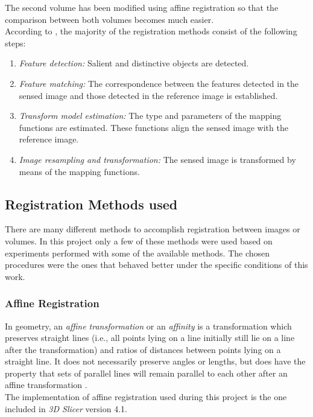 The second volume has been modified using affine registration so that
the comparison between both volumes becomes much easier.\\

According to \cite{zitova}, the majority of the registration methods consist of the following steps:
\begin{enumerate}
\item \textit{Feature detection:} Salient and distinctive objects are detected.
\item \textit{Feature matching:} The correspondence between the features detected in the sensed image and those detected in the reference image is established.
\item \textit{Transform model estimation:} The type and parameters of the mapping functions are estimated. These functions align the sensed image with the reference image.
\item \textit{Image resampling and transformation:} The sensed image is transformed by means of the mapping functions.
\end{enumerate}


\subsection{Registration Methods used}
\label{sec:reg_methods}
There are many different methods to accomplish registration between
images or volumes. In this project only a few of these methods were
used based on experiments performed with some of the available
methods. The chosen procedures were the ones that behaved better
under the specific conditions of this work.


\subsubsection{Affine Registration}
In geometry, an \textit{affine transformation} or an \textit{affinity}
is a transformation which preserves straight lines (i.e., all points
lying on a line initially still lie on a line after the
transformation) and ratios of distances between points lying on a
straight line. It does not necessarily preserve angles or lengths, but
does have the property that sets of parallel lines will remain
parallel to each other after an affine transformation \cite{affine_t}. \\

The implementation of affine registration used during this project is
the one included in \textit{3D Slicer} version 4.1. 

